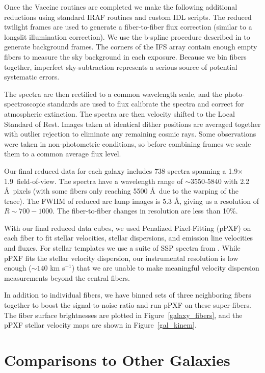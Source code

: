 \documentclass[12pt,preprint]{aastex}
\newcommand\kms{km s$^{-1}$}
\begin{document}
Once the Vaccine routines are completed we make the following additional reductions using standard IRAF routines and custom IDL scripts.
The reduced twilight frames are used to generate a fiber-to-fiber flux correction (similar to a longslit illumination correction).
We use the b-spline procedure described in \citet{Kelson03} to generate background frames.
The corners of the IFS array contain enough empty fibers to measure the sky background in each exposure.
Because we bin fibers together, imperfect sky-subtraction represents a serious source of potential systematic errors.


The spectra are then rectified to a common wavelength scale, and the photo-spectroscopic standards are used to flux calibrate the spectra and correct for atmospheric extinction.
The spectra are then velocity shifted to the Local Standard of Rest.
Images taken at identical dither positions are averaged together with outlier rejection to eliminate any remaining cosmic rays.
Some observations were taken in non-photometric conditions, so before combining frames we scale them to a common average flux level.


Our final reduced data for each galaxy includes 738 spectra spanning a 1.9\arcmin$\times$1.9\arcmin\ field-of-view.
The spectra have a wavelength range of $\sim$3550-5840 with 2.2 \AA\ pixels (with some fibers only reaching 5500 \AA\ due to the warping of the trace).
The FWHM of reduced arc lamp images is 5.3 \AA, giving us a resolution of $R\sim700-1000$.
The fiber-to-fiber changes in resolution are less than 10\%.


With our final reduced data cubes, we used Penalized Pixel-Fitting (pPXF) \citep{Cappellari04} on each fiber to fit stellar velocities, stellar dispersions, and emission line velocities and fluxes.
For stellar templates we use a suite of SSP spectra from \citet{Bruzual03}.
While pPXF fits the stellar velocity dispersion, our instrumental resolution is low enough ($\sim140$ \kms) that we are unable to make meaningful velocity dispersion measurements beyond the central fibers.

In addition to individual fibers, we have binned sets of three neighboring fibers together to boost the signal-to-noise ratio and run pPXF on these super-fibers. The fiber surface brightnesses are plotted in Figure~\ref{galaxy_fibers}, and the pPXF stellar velocity maps are shown in Figure~\ref{gal_kinem}.

\section{Comparisons to Other Galaxies}\label{sec:compare_gals}
\end{document}
